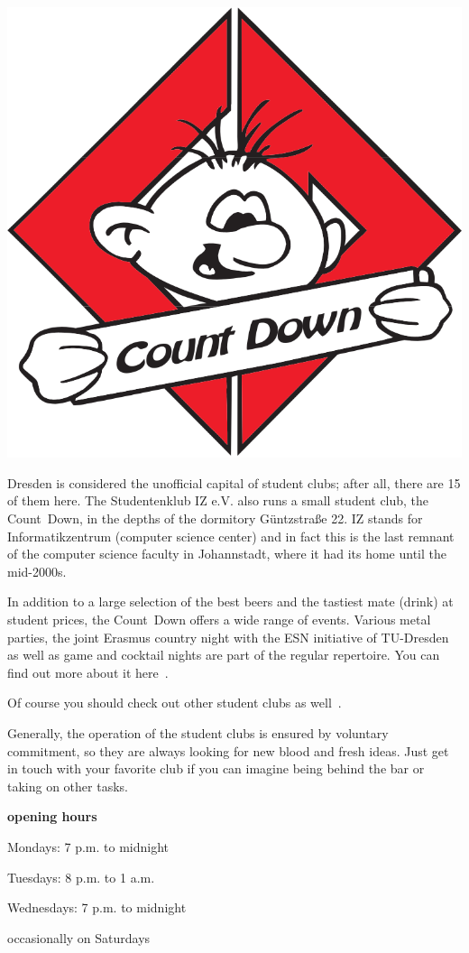 \includegraphics[width=\linewidth]{img/countdown.svg}

Dresden is considered the unofficial capital of student clubs; after all, there are 15 of them here.
The Studentenklub IZ e.V. also runs a small student club, the Count~Down, in the depths of the dormitory Güntzstraße 22.
IZ stands for Informatikzentrum (computer science center) and in fact this is the last remnant of the computer science faculty in Johannstadt, where it had its home until the mid-2000s.

In addition to a large selection of the best beers and the tastiest mate (drink) at student prices, the Count~Down offers a wide range of events. Various metal parties, the joint Erasmus country night with the ESN initiative of TU-Dresden as well as game and cocktail nights are part of the regular repertoire.
You can find out more about it here~.

Of course you should check out other student clubs as well~.

Generally, the operation of the student clubs is ensured by voluntary commitment, so they are always looking for new blood and fresh ideas. Just get in touch with your favorite club if you can imagine being behind the bar or taking on other tasks.

\textbf{opening hours}

Mondays: 7 p.m. to midnight

Tuesdays: 8 p.m. to 1 a.m.

Wednesdays: 7 p.m. to midnight

occasionally on Saturdays
